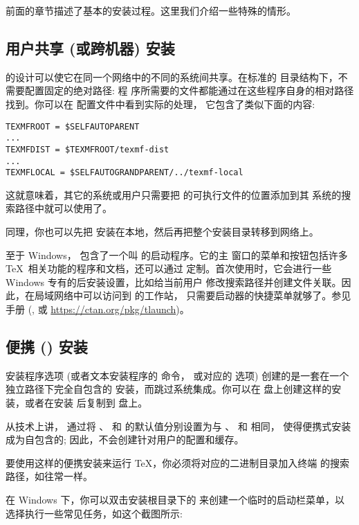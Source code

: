 \documentclass{article}
\begin{document}
前面的章节描述了基本的安装过程。这里我们介绍一些特殊的情形。

\subsection{用户共享 (或跨机器) 安装}
\label{sec:sharedinstall}

\TL{} 的设计可以使它在同一个网络中的不同的系统间共享。在标准的
目录结构下，不需要配置固定的绝对路径: \TL{} 程
序所需要的文件都能通过在这些程序自身的相对路径找到。你可以在
 配置文件中看到实际的处理，
它包含了类似下面的内容: 
\begin{verbatim}
TEXMFROOT = $SELFAUTOPARENT
...
TEXMFDIST = $TEXMFROOT/texmf-dist
...
TEXMFLOCAL = $SELFAUTOGRANDPARENT/../texmf-local
\end{verbatim}
这就意味着，其它的系统或用户只需要把 \TL{} 的可执行文件的位置添加到其
系统的搜索路径中就可以使用了。

同理，你也可以先把 \TL{} 安装在本地，然后再把整个安装目录转移到网络上。

至于 Windows，\TL{} 包含了一个叫  的启动程序。它的主
窗口的菜单和按钮包括许多 \TeX\ 相关功能的程序和文档，还可以通过 
定制。首次使用时，它会进行一些 Windows 专有的后安装设置，比如给当前用户
修改搜索路径并创建文件关联。因此，在局域网络中可以访问到 \TL{} 的工作站，
只需要启动器的快捷菜单就够了。参见  手册 (,
或 \url{https://ctan.org/pkg/tlaunch})。

\subsection{便携 (\USB{}) 安装}
\label{sec:portable-tl}

 安装程序选项 (或者文本安装程序的  命令，
或对应的 \GUI{} 选项) 创建的是一套在一个独立路径下完全自包含的 \TL{}
安装，而跳过系统集成。你可以在 \USB{} 盘上创建这样的安装，或者在安装
后复制到 \USB{} 盘上。

从技术上讲，
通过将 、 和  的默认值分别设置为与
、 和  相同，
使得便携式安装成为自包含的; 因此，不会创建针对用户的配置和缓存。

要使用这样的便携安装来运行 \TeX{}，你必须将对应的二进制目录加入终端
的搜索路径，如往常一样。

在 Windows 下，你可以双击安装根目录下的 
来创建一个临时的启动栏菜单，以选择执行一些常见任务，如这个截图所示: 
\end{document}
